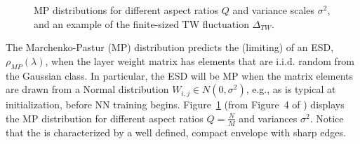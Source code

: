 \begin{figure}[t] %
    \centering  
    \caption{MP distributions for different aspect ratios $Q$ and variance scales $\sigma^2$, and an example of the finite-sized TW fluctuation $\Delta_{TW}$. }
   \label{fig:MP-esds}
\end{figure}

The Marchenko-Pastur (MP) distribution predicts the (limiting) \SHAPE of an ESD, $\rho_{MP}(\lambda)$, when the layer weight matrix has elements that are i.i.d. random from the Gaussian \Universality class.
In particular, the ESD will be MP when the matrix elements are drawn from a Normal distribution $W_{i,j}\in  N(0,\sigma^{2})$, e.g., as is typical at initialization, before NN training begins.
Figure~\ref{fig:MP-esds} (from Figure~4 of \cite{MM18_TR_JMLRversion}) displays the MP distribution for different aspect ratios $Q=\tfrac{N}{M}$ and variances $\sigma^{2}$.  
Notice that the \SHAPE is characterized by a well defined, compact envelope with sharp edges.

